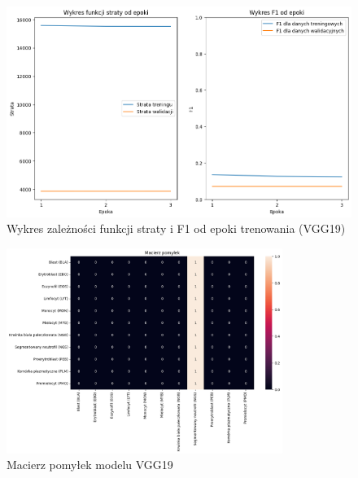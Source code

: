 \begin{figure}
    \centering
    \includegraphics[width=\textwidth]{experiments/vgg19/combined}
    \caption{Wykres zależności funkcji straty i F1 od epoki trenowania (VGG19)}
    \label{fig:plot_vgg19}
\end{figure}
\begin{figure}
    \centering
    \includegraphics[width=0.8\textwidth]{experiments/vgg19/confusion_matrix}
    \caption{Macierz pomyłek modelu VGG19}
    \label{fig:confusion_vgg19}
\end{figure}

